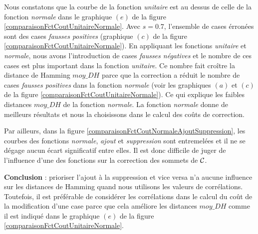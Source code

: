  \FloatBarrier
Nous constatons que la courbe de la fonction {\em unitaire} est au dessus de celle de la fonction {\em normale} dans le graphique $(e)$ de la figure \ref{comparaisonFctCoutUnitaireNormale}.
Avec $s=0.7$, l'ensemble de cases \'erron\'ees sont des cases {\em fausses positives} (graphique $(c)$ de la figure \ref{comparaisonFctCoutUnitaireNormale}).
En appliquant les fonctions {\em unitaire} et {\em normale}, nous avons l'introduction de cases {\em fausses n\'egatives} et le nombre de ces cases est plus important dans la fonction {\em unitaire}. Ce nombre fait cro\^itre la distance de Hamming $moy\_DH$ parce que la correction a r\'eduit le nombre de cases {\em fausses positives} dans la fonction {\em normale} (voir les graphiques $(a)$ et $(c)$ de la figure  \ref{comparaisonFctCoutUnitaireNormale}).
Ce qui explique les faibles distances $moy\_DH$ de la fonction {\em normale}. La fonction {\em normale} donne de meilleurs r\'esultats et nous la choisissons dans le calcul des co\^uts de correction.
\newline

Par ailleurs, dans la figure \ref{comparaisonFctCoutNormaleAjoutSuppression}, les courbes des  fonctions  {\em normale}, {\em ajout} et {\em suppression} sont entremel\'ees et il ne se d\'egage aucun \'ecart significatif entre elles. Il est donc difficile de juger de l'influence d'une des fonctions sur la correction des sommets de $\cal C$.  
\newline 

{\bf Conclusion} :
 prioriser l'ajout \`a la suppression et vice versa n'a aucune influence sur les distances de Hamming quand nous utilisons les valeurs de corr\'elations. Toutefois,  il est pr\'ef\'erable de consid\'erer les corr\'elations dans le calcul du co\^ut de la modification d'une case parce que cela am\'eliore les distances $moy\_DH$ comme il est indiqu\'e dans le graphique $(e)$  de la figure \ref{comparaisonFctCoutUnitaireNormale}.